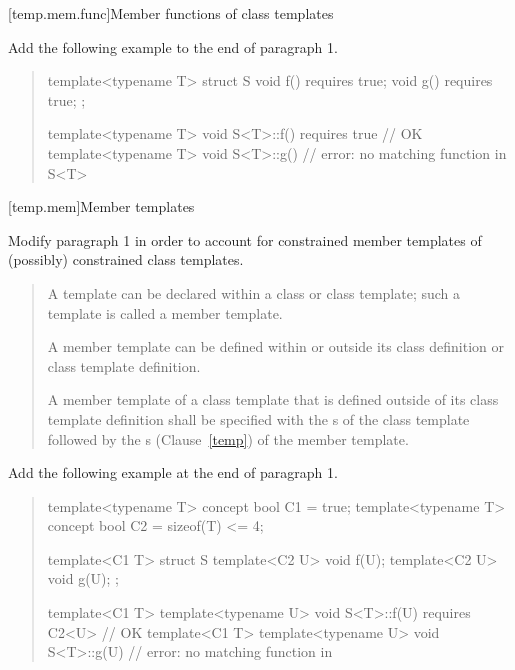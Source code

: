 [temp.mem.func]{Member functions of class templates}

Add the following example to the end of paragraph 1.

\begin{quote}
\begin{addedblock}
\enterexample
\begin{codeblock}
template<typename T> struct S {
  void f() requires true;
  void g() requires true;
};

template<typename T> 
  void S<T>::f() requires true { } // OK
template<typename T> 
  void S<T>::g() { }               // error: no matching function in S<T>
\end{codeblock}
\exitexample
\end{addedblock}
\end{quote}


[temp.mem]{Member templates}


Modify paragraph 1 in order to account for constrained member templates
of (possibly) constrained class templates. 

\begin{quote}
A template can be declared within a class or class template; such a 
template is called a member template. 

A member template can be defined within or outside its class definition 
or class template definition. 

A member template of a class template that is defined outside of its 
class template definition shall be specified with the 
s 
of the class template followed by the s
 (Clause~\ref{temp}) of the member template.
\end{quote}


Add the following example at the end of paragraph 1.

\begin{quote}
\begin{addedblock}
\enterexample
\begin{codeblock}
template<typename T> concept bool C1 = true;
template<typename T> concept bool C2 = sizeof(T) <= 4;

template<C1 T>
  struct S {
    template<C2 U> void f(U);
    template<C2 U> void g(U);
  };

template<C1 T> template<typename U> 
  void S<T>::f(U) requires C2<U> { } // OK
template<C1 T> template<typename U> 
  void S<T>::g(U) { }                // error: no matching function in 
\end{codeblock}
\exitexample
\end{addedblock}
\end{quote}


